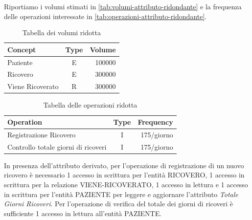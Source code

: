 \documentclass{article}
\begin{document}
Riportiamo i volumi stimati in \autoref{tab:volumi-attributo-ridondante} e la frequenza delle operazioni interessate in \autoref{tab:operazioni-attributo-ridondante}.

\begin{table}[H]
	\centering
	\begin{tabular}{|l|c|r|}
		\hline
		\textbf{Concept} & \textbf{Type} & \textbf{Volume} \\ \hline
		Paziente         & E             & 100000          \\ \hline
		Ricovero         & E             & 300000          \\ \hline
		Viene Ricoverato & R             & 300000          \\ \hline
	\end{tabular}
	\caption{Tabella dei volumi ridotta}
	\label{tab:volumi-attributo-ridondante}
\end{table}

\begin{table}[H]
	\centering
	\begin{tabular}{|l|c|r|}
		\hline
		\textbf{Operation}                  & \textbf{Type} & \textbf{Frequency} \\ \hline
		Registrazione Ricovero              & I             & 175/giorno         \\ \hline
		Controllo totale giorni di ricoveri & I             & 175/giorno         \\ \hline %
	\end{tabular}
	\caption{Tabella delle operazioni ridotta}
	\label{tab:operazioni-attributo-ridondante}
\end{table}

In presenza dell'attributo derivato, per l'operazione di registrazione di un nuovo ricovero è necessario 1 accesso in scrittura per l'entità RICOVERO, 1 accesso in scrittura per la relazione VIENE-RICOVERATO, 1 accesso in lettura e 1 accesso in scrittura per l'entità PAZIENTE per leggere e aggiornare l'attributo \textit{Totale Giorni Ricoveri}.
Per l'operazione di verifica del totale dei giorni di ricoveri è sufficiente 1 accesso in lettura all'entità PAZIENTE.
\end{document}
